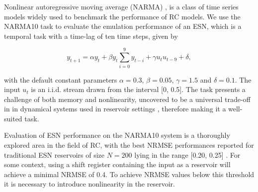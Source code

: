 Nonlinear autoregressive moving average (NARMA) \cite{atiya_new_2000},
\cite{kubota_dynamical_2019} is a class of time series models widely used to
benchmark the performance of RC models. We use the NARMA10 task to evaluate the
emulation performance of an ESN, which is a temporal task with a time-lag of ten
time steps, given by


\begin{equation}
  y_{t+1} = \alpha y_{t} +
  \beta y_{t} \sum_{i=0}^{9}y_{t-i} +
  \gamma u_{t}u_{t-9} +
  \delta,
  \label{narma}
\end{equation}

\noindent with the default constant parameters $\alpha = 0.3$, $\beta = 0.05$,
$\gamma = 1.5$ and $\delta = 0.1$. The input $u_{t}$ is an i.i.d. stream drawn
from the interval [0, 0.5]. The task presents a challenge of both memory and
nonlinearity, uncovered to be a universal trade-off in in dynamical systems used
in reservoir settings \cite{dambre_information_2012, verstraeten_memory_2010},
therefore making it a well-suited task.

Evaluation of ESN performance on the NARMA10 system is a thoroughly explored
area in the field of RC, with the best NRMSE performances reported for
traditional ESN reservoirs of size $N = 200$ lying in the range [0.20, 0.25]
\cite{goudarzi_comparative_2014, rodan_minimum_2011,
verstraeten_experimental_2007, jaeger_adaptive_nodate}. For some context, using
a shift register containing the input as a reservoir will achieve a minimal
NRMSE of 0.4. To achieve NRMSE values below this threshold it is necessary to
introduce nonlinearity in the reservoir.


